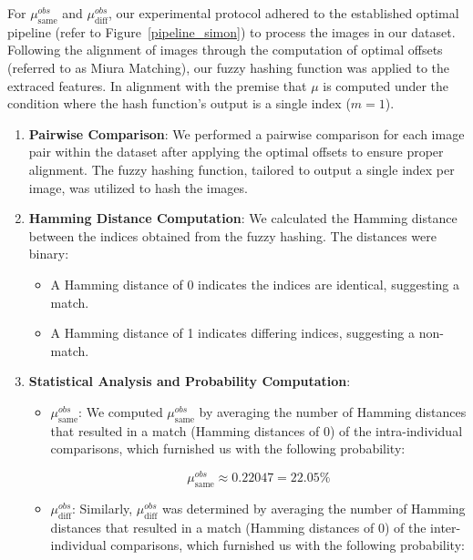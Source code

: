 For \(\mu_{\text{same}}^{obs}\) and \(\mu_{\text{diff}}^{obs}\), our experimental protocol adhered to the established optimal pipeline (refer to Figure~\ref{pipeline_simon}) to process the images in our dataset. Following the alignment of images through the computation of optimal offsets (referred to as Miura Matching), our fuzzy hashing function was applied to the extraced features. In alignment with the premise that \(\mu\) is computed under the condition where the hash function's output is a single index (\(m=1\)).

\begin{enumerate}
    \item \textbf{Pairwise Comparison}: We performed a pairwise comparison for each image pair within the dataset after applying the optimal offsets to ensure proper alignment. The fuzzy hashing function, tailored to output a single index per image, was utilized to hash the images.

    \item \textbf{Hamming Distance Computation}: We calculated the Hamming distance between the indices obtained from the fuzzy hashing. The distances were binary:
    \begin{itemize}
        \item A Hamming distance of 0 indicates the indices are identical, suggesting a match.
        \item A Hamming distance of 1 indicates differing indices, suggesting a non-match.
    \end{itemize} 
    
    \item \textbf{Statistical Analysis and Probability Computation}:
    \begin{itemize}
        \item \textbf{\(\mu_{\text{same}}^{obs}\)}: We computed \(\mu_{\text{same}}^{obs}\) by averaging the number of Hamming distances that resulted in a match (Hamming distances of 0) of the intra-individual comparisons, which furnished us with the following probability:

        \[ \mu_{\text{same}}^{obs} \approx 0.22047 = 22.05\%\]
        
        \item \textbf{\(\mu_{\text{diff}}^{obs}\)}: Similarly, \(\mu_{\text{diff}}^{obs}\) was determined by averaging the number of Hamming distances that resulted in a match (Hamming distances of 0) of the inter-individual comparisons, which furnished us with the following probability:


\end{itemize}
\end{enumerate}
